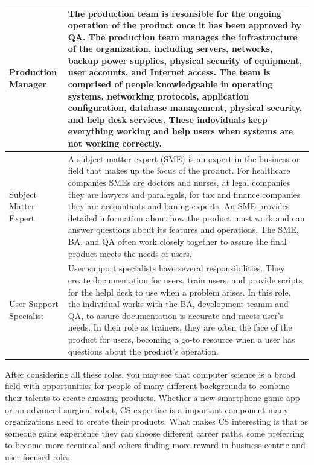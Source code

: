\begin{longtable}[!htb]{p{.8in}|p{3.6in}}
	\hline
	\Tstrut Production Manager & The production team is resonsible for the ongoing operation of the product once it has been approved by QA. The production team manages the infrastructure of the organization, including servers, networks, backup power supplies, physical security of equipment, user accounts, and Internet access. The team is comprised of people knowledgeable in operating systems, networking protocols, application configuration, database management, physical security, and help desk services. These indoviduals keep everything working and help users when systems are not working correctly.\\
	\hline
	\Tstrut Subject \linebreak Matter \linebreak Expert & A subject matter expert (SME) is an expert in the business or field that makes up the focus of the product. For healthcare companies SMEs are doctors and nurses, at legal companies they are lawyers and paralegals, for tax and finance companies they are accountants and baning experts. An SME provides detailed information about how the product must work and can answer questions about its features and operations. The SME, BA, and QA often work closely together to assure the final product meets the needs of users.\\
	\hline
	\Tstrut User \linebreak Support \linebreak Specialist & User support specialists have several responsibilities. They create documentation for users, train users, and provide scripts for the helpl desk to use when a problem arises. In this role, the individual works with the BA, development teamm and QA, to assure documentation is accurate and meets user's needs. In their role as trainers, they are often the face of the product for users, becoming a go-to resource when a user has questions about the product's operation.\\ 
	\bottomrule
\end{longtable}


After considering all these roles, you may see that computer science is a broad field with opportunities for people of many different backgrounds to combine their talents to create amazing products. Whether a new smartphone game app or an advanced surgical robot, CS expertise is a important component many organizations need to create their products. What makes CS interesting is that as someone gains experience they can choose different career paths, some preferring to become more tecnincal and others finding more reward in business-centric and user-focused roles.

